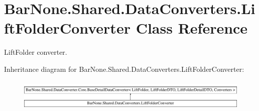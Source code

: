 \hypertarget{class_bar_none_1_1_shared_1_1_data_converters_1_1_lift_folder_converter}{}\section{Bar\+None.\+Shared.\+Data\+Converters.\+Lift\+Folder\+Converter Class Reference}
\label{class_bar_none_1_1_shared_1_1_data_converters_1_1_lift_folder_converter}


Lift\+Folder converter.  


Inheritance diagram for Bar\+None.\+Shared.\+Data\+Converters.\+Lift\+Folder\+Converter\+:\begin{figure}[H]
\begin{center}
\leavevmode
\includegraphics[height=1.511471cm]{class_bar_none_1_1_shared_1_1_data_converters_1_1_lift_folder_converter}
\end{center}
\end{figure}
